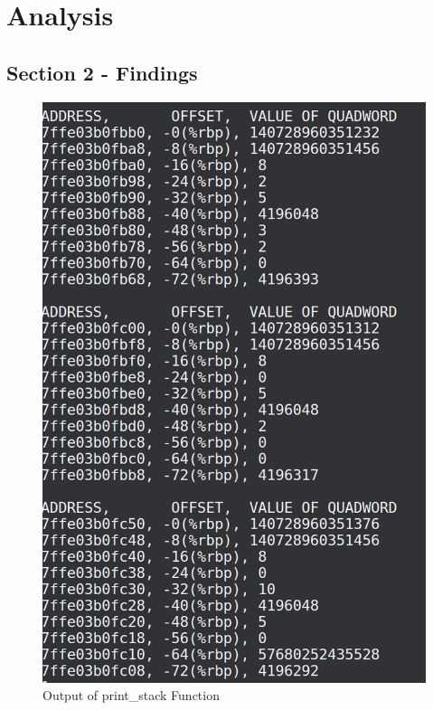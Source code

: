 \documentclass[11]{article}
\begin{document}
	\section{Analysis}
		\subsection{Section 2 - Findings}
			\begin{figure}
				\includegraphics[scale=0.5]{Print_Stack_Output.png}
				\caption{Output of print\_stack Function}
			\end{figure}
			
\end{document}
